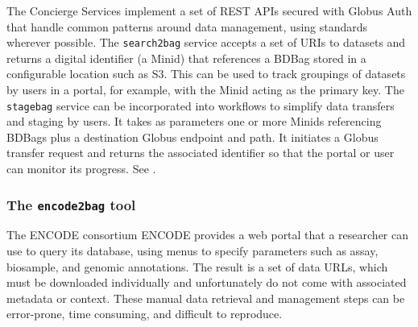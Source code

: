 \documentclass[11pt]{article}
\begin{document}
The Concierge Services implement a set of REST APIs secured with Globus Auth that handle common patterns around data management, using standards wherever possible. 
The \texttt{search2bag} service accepts a set of URIs to datasets and returns a digital identifier (a Minid) that references a BDBag stored in a configurable location such as S3. 
This can be used to track groupings of datasets by users in a portal, for example, with the Minid acting as the primary key. 
The \texttt{stagebag} service can be incorporated into workflows to simplify data transfers and staging by users. 
It takes as parameters one or more Minids referencing BDBags plus
a destination Globus endpoint and path. 
It initiates a Globus transfer request and returns the associated identifier so that  
 the portal or user can monitor its progress. 
See .

\subsubsection{The \texttt{encode2bag} tool}

The 
ENCODE consortium 
ENCODE provides a web portal that a researcher can use to query its database,
using menus to specify parameters such as assay, biosample, and genomic annotations.
The result is a set of data URLs,
which must be downloaded individually and unfortunately do not come with associated metadata or context.
These manual data retrieval and management steps can be error-prone,
time consuming, and difficult to reproduce.
\end{document}

